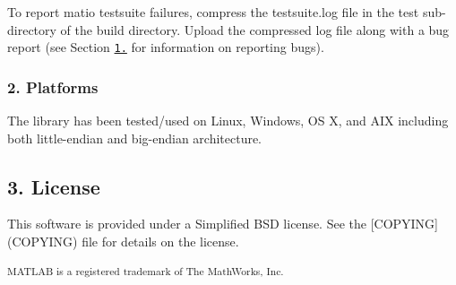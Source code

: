 To report matio testsuite failures, compress the testsuite.\+log file in the test sub-\/directory of the build directory. Upload the compressed log file along with a bug report (see Section \href{#14-questions-and-reporting-bugs}{\tt 1.} for information on reporting bugs).

\subsubsection*{2. Platforms}

The library has been tested/used on Linux, Windows, OS X, and A\+IX including both little-\/endian and big-\/endian architecture.

\subsection*{3. License}

This software is provided under a Simplified B\+SD license. See the \mbox{[}C\+O\+P\+Y\+I\+NG\mbox{]}(C\+O\+P\+Y\+I\+NG) file for details on the license.

\textsubscript{M\+A\+T\+L\+AB is a registered trademark of The Math\+Works, Inc.} 
